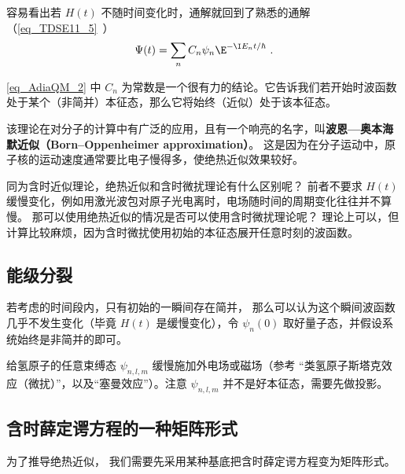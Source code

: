 容易看出若 $H(t)$ 不随时间变化时，通解就回到了熟悉的通解（\autoref{eq_TDSE11_5}~）
\begin{equation}
\Psi(t) = \sum_n C_n \psi_n \E^{-\I E_n t/\hbar}~.
\end{equation}

\autoref{eq_AdiaQM_2} 中 $C_n$ 为常数是一个很有力的结论。它告诉我们若开始时波函数处于某个（非简并）本征态，那么它将始终（近似）处于该本征态。

该理论在对分子的计算中有广泛的应用，且有一个响亮的名字，叫\textbf{波恩—奥本海默近似（Born–Oppenheimer approximation）}。 这是因为在分子运动中，原子核的运动速度通常要比电子慢得多，使绝热近似效果较好。

同为含时近似理论，绝热近似和含时微扰理论有什么区别呢？ 前者不要求 $H(t)$ 缓慢变化，例如用激光波包对原子光电离时，电场随时间的周期变化往往并不算慢。 那可以使用绝热近似的情况是否可以使用含时微扰理论呢？ 理论上可以，但计算比较麻烦，因为含时微扰使用初始的本征态展开任意时刻的波函数。

\subsection{能级分裂}
若考虑的时间段内，只有初始的一瞬间存在简并， 那么可以认为这个瞬间波函数几乎不发生变化（毕竟 $H(t)$ 是缓慢变化），令 $\psi_n(0)$ 取好量子态，并假设系统始终是非简并的即可。
\begin{example}{}
给氢原子的任意束缚态 $\psi_{n,l,m}$ 缓慢施加外电场或磁场（参考 “类氢原子斯塔克效应（微扰）”，以及“塞曼效应”）。注意 $\psi_{n,l,m}$ 并不是好本征态，需要先做投影。
\end{example}

\subsection{含时薛定谔方程的一种矩阵形式}
为了推导绝热近似， 我们需要先采用某种基底把含时薛定谔方程变为矩阵形式。


